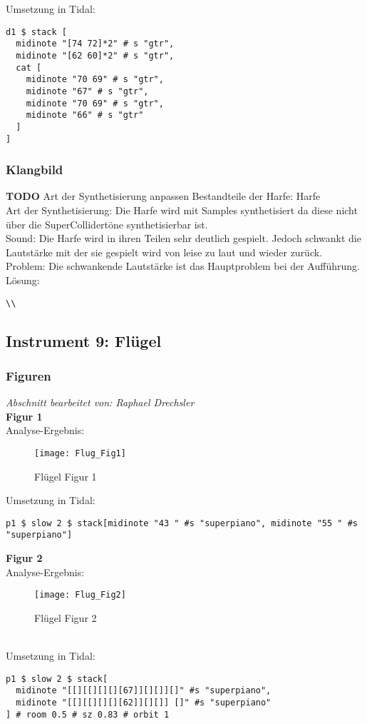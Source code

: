 \documentclass[
10pt, %
a4paper, %
oneside, %
headinclude,footinclude, %
BCOR5mm, %
]{scrartcl}
\begin{document}
\noindent Umsetzung in Tidal:
\begin{lstlisting}
d1 $ stack [
  midinote "[74 72]*2" # s "gtr",
  midinote "[62 60]*2" # s "gtr",
  cat [
    midinote "70 69" # s "gtr",
    midinote "67" # s "gtr",
    midinote "70 69" # s "gtr",
    midinote "66" # s "gtr"
  ]
] 
\end{lstlisting}



\subsubsection{Klangbild}
{\color{red}\textbf{TODO}} Art der Synthetisierung anpassen
Bestandteile der Harfe: Harfe\\
Art der Synthetisierung: Die Harfe wird mit Samples synthetisiert da diese nicht über die SuperCollidertöne synthetisierbar ist.\\
Sound: Die Harfe wird in ihren Teilen sehr deutlich gespielt. Jedoch schwankt die Lautstärke mit der sie gespielt wird von leise zu laut und wieder zurück.\\
Problem: Die schwankende Lautstärke ist das Hauptproblem bei der Aufführung.\\
Lösung:\\
\begin{lstlisting}
\\
\end{lstlisting}


\subsection{Instrument 9: Flügel}
\subsubsection{Figuren}
\textit{Abschnitt bearbeitet von: Raphael Drechsler}\\

\noindent\textbf{Figur 1}\\
Analyse-Ergebnis:
\begin{figure}[h]
	\centering 
	\texttt{[image: Flug\_Fig1]} 
	\caption{Flügel Figur 1}
\end{figure}
\noindent Umsetzung in Tidal:
\begin{lstlisting}
p1 $ slow 2 $ stack[midinote "43 " #s "superpiano", midinote "55 " #s "superpiano"]
\end{lstlisting}

\noindent \textbf{Figur 2}\\
Analyse-Ergebnis:
\begin{figure}[h]
	\centering 
	\texttt{[image: Flug\_Fig2]} 
	\caption{Flügel Figur 2}
\end{figure}\\
\noindent Umsetzung in Tidal:
\begin{lstlisting}
p1 $ slow 2 $ stack[
  midinote "[[][[][][][67]][][]][]" #s "superpiano",
  midinote "[[][[][][][62]][][]] []" #s "superpiano"
] # room 0.5 # sz 0.83 # orbit 1
\end{lstlisting}
\end{document}
